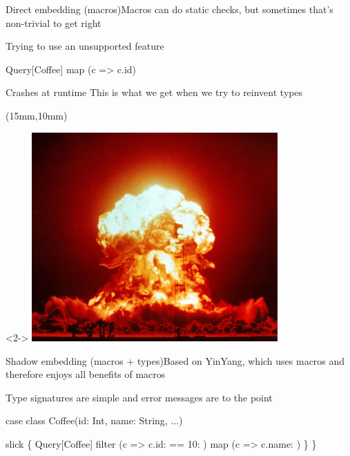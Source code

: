\documentclass{beamer}
\begin{document}
\begin{frame}[fragile]{Direct embedding (macros)}{Macros can do static checks, but sometimes that's non-trivial to get right}
  \vspace{1em}
  \begin{exampleblock}{Trying to use an unsupported feature}
  \begin{semiverbatim}
Query[Coffee] map
  (c => c.id\text{\color{blue}{.toDouble}})
  \end{semiverbatim}
  \end{exampleblock}

  \vspace{1em}
  \begin{alertblock}{Crashes at runtime}
  \vspace{1em}
  This is what we get when we try to reinvent types
  \end{alertblock}

  \begin{textblock*}{\textwidth}(15mm,10mm)
    \begin{visibleenv}<2->
      \includegraphics[height=8cm]{img/boom.jpg}
    \end{visibleenv}
  \end{textblock*}
\end{frame}

\begin{frame}[fragile]{Shadow embedding (macros + types)}{Based on YinYang, which uses macros and therefore enjoys all benefits of macros}
  \vspace{1em}
  \begin{exampleblock}{Type signatures are simple and error messages are to the point}
  \begin{semiverbatim}
case class Coffee(id: Int, name: String, ...)

slick \{
  Query[Coffee] filter
    (c => c.id: \text{\color{blue}{Int}} == 10: \text{\color{blue}{Int}}) map
    (c => c.name: \text{\color{blue}{String}})
  \}
\}\end{semiverbatim}
  \end{exampleblock}
\end{frame}
\end{document}
